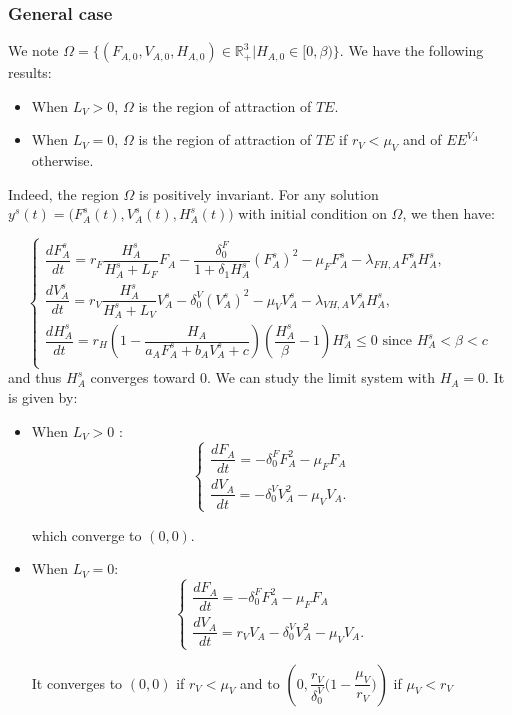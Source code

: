 \documentclass{article}
\newcommand{\dv}{\delta_0^V}
\begin{document}
\subsubsection{General case}

We note $\Omega = \Big\{(F_{A,0}, V_{A, 0}, H_{A, 0}) \in \mathbb{R}_+^3 | H_{A, 0} \in [0, \beta) \Big\}$. We have the following results:
\begin{itemize}
\item When $L_V > 0$, $\Omega$ is the region of attraction of $TE$.
\item When $L_V = 0$, $\Omega$ is the region of attraction of $TE$ if $r_V < \mu_V$ and of $EE^{V_A}$ otherwise.
\end{itemize}

Indeed, the region $ \Omega$ is positively invariant. 
For any solution $y^s(t) = \Big(F_A^s(t), V_A^s(t), H_A^s(t)\Big)$ with initial condition on $\Omega$, we then have:

\begin{equation}
\left\{ \begin{array}{l}
\dfrac{dF_{A}^s}{dt}=r_F  \dfrac{H_A^s}{H_A^s+L_F}F_A - \dfrac{\delta_0^F}{1 +\delta_1 H_A^s}(F_A^s)^2-\mu_{F}F_A^s-\lambda_{FH,A}F_A^sH_A^s,\\
\dfrac{dV_{A}^s}{dt}=r_V  \dfrac{H_A^s}{H_A^s+L_V}V_A^s - \delta_0^V (V_A^s)^2-\mu_{V}V_A^s-\lambda_{VH,A}V_A^sH_A^s,\\
\dfrac{dH_A^s}{dt}= r_{H}\left(1-\dfrac{H_A}{a_{A}F_{A}^s + b_A V_A^s +c}\right)\left(\dfrac{H_A^s}{\beta}-1\right)H_A^s \leq 0 \text{ since $H_A^s < \beta < c$} \\
\end{array}\right.
\end{equation} 
and thus $H_A^s$ converges toward $0$. We can study the limit system with $H_A = 0$. It is given by:

\begin{itemize}
\item When $L_V > 0$ :
\begin{equation}
\left\{ \begin{array}{l}
\dfrac{dF_{A}}{dt}= - \delta_0^F F_A^2-\mu_{F}F_A \\
\dfrac{dV_{A}}{dt}= - \delta_0^V V_A^2-\mu_{V}V_A.
\end{array}\right.
\end{equation}

which converge to $(0,0)$.
\item When $L_V = 0$:
\begin{equation}
\left\{ \begin{array}{l}
\dfrac{dF_{A}}{dt}= - \delta_0^F F_A^2-\mu_{F}F_A \\
\dfrac{dV_{A}}{dt}= r_V V_A - \delta_0^V V_A^2-\mu_{V}V_A.
\end{array}\right.
\end{equation}

It converges to $(0, 0)$ if $r_V < \mu_V$ and to $\left(0, \dfrac{r_V}{\dv} \Big(1-\dfrac{\mu_V}{r_V}\Big) \right)$ if $\mu_V < r_V$
\end{itemize}
\end{document}
